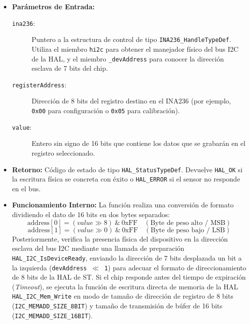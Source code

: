 \documentclass[
10pt, %
a4paper, %
oneside, %
headinclude,footinclude, %
BCOR5mm, %
]{scrartcl}
\begin{document}
\begin{itemize}
	\item \textbf{Parámetros de Entrada:}
		\begin{description}
			\item[\texttt{ina236}:] Puntero a la estructura de control de tipo \texttt{INA236\_HandleTypeDef}. Utiliza el miembro \texttt{hi2c} para obtener el manejador físico del bus I2C de la HAL, y el miembro \texttt{\_devAddress} para conocer la dirección esclava de 7 bits del chip.
			\item[\texttt{registerAddress}:] Dirección de 8 bits del registro destino en el INA236 (por ejemplo, \texttt{0x00} para configuración o \texttt{0x05} para calibración).
			\item[\texttt{value}:] Entero sin signo de 16 bits que contiene los datos que se grabarán en el registro seleccionado.
		\end{description}
	\item \textbf{Retorno:} Código de estado de tipo \texttt{HAL\_StatusTypeDef}. Devuelve \texttt{HAL\_OK} si la escritura física se concreta con éxito o \texttt{HAL\_ERROR} si el sensor no responde en el bus.
	\item \textbf{Funcionamiento Interno:}
		La función realiza una conversión de formato dividiendo el dato de 16 bits en dos bytes separados:
		\begin{equation}
			\text{address}[0] = (value \gg 8) \ \& \ \text{0xFF} \quad (\text{Byte de peso alto / MSB})
		\end{equation}
		\begin{equation}
			\text{address}[1] = (value \gg 0) \ \& \ \text{0xFF} \quad (\text{Byte de peso bajo / LSB})
		\end{equation}
		Posteriormente, verifica la presencia física del dispositivo en la dirección esclava del bus I2C mediante una llamada de preparación \texttt{HAL\_I2C\_IsDeviceReady}, enviando la dirección de 7 bits desplazada un bit a la izquierda (\texttt{devAddress $\ll$ 1}) para adecuar el formato de direccionamiento de 8 bits de la HAL de ST. Si el chip responde antes del tiempo de expiración (\textit{Timeout}), se ejecuta la función de escritura directa de memoria de la HAL \texttt{HAL\_I2C\_Mem\_Write} en modo de tamaño de dirección de registro de 8 bits (\texttt{I2C\_MEMADD\_SIZE\_8BIT}) y tamaño de transmisión de búfer de 16 bits (\texttt{I2C\_MEMADD\_SIZE\_16BIT}).
\end{itemize}
\end{document}
